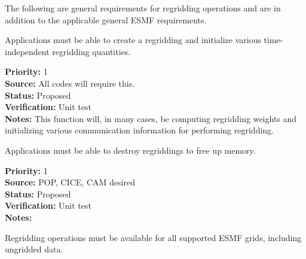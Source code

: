 

The following are general requirements for regridding operations and are in
addition to the applicable general ESMF requirements.


Applications must be able to create a regridding and initialize
various time-independent regridding quantities.

\begin{reqlist}
{\bf Priority:} 1 \\
{\bf Source:} All codes will require this. \\
{\bf Status:} Proposed \\
{\bf Verification:} Unit test \\
{\bf Notes:} This function will, in many cases, be computing
             regridding weights and initializing various
             communication information for performing regridding.
\end{reqlist}


Applications must be able to destroy regriddings to free up memory.

\begin{reqlist}
{\bf Priority:} 1 \\
{\bf Source:} POP, CICE, CAM desired \\
{\bf Status:} Proposed \\
{\bf Verification:} Unit test \\
{\bf Notes:} 
\end{reqlist}


Regridding operations must be available for all supported ESMF grids,
including ungridded data.

